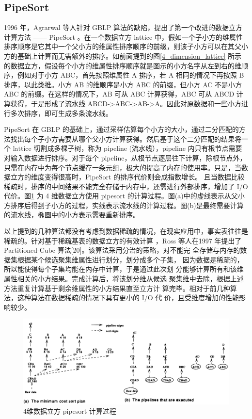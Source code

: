 \subsection{PipeSort}

1996 年，Agrarwal 等人针对 GBLP 算法的缺陷，提出了第一个改进的数据立方计算方法 —— PipeSort\cite{agarwal1996computation} 。在一个数据立方 lattice 中，假如一个子小方的维属性排序顺序是它其中一个父小方的维属性排序顺序的前缀，则该子小方可以在其父小方的基础上计算而无需额外的排序。如前面提到的图\ref{4_dimension_lattice} 所示的数据立方，假设每个小方的维属性排序顺序就是图示的小方名字从左到右的维顺序，例如对于小方 ABC，首先按照维属性 A 排序，若 A 相同的情况下再按照 B 排序，以此类推。小方 AB 的维顺序是小方 ABC 的前缀，但小方 AC 不是小方 ABC 的前缀。在这样的情况下，AB 可从 ABC 计算获得，ABC 可从 ABCD 计算获得，于是形成了流水线 ABCD-\textgreater ABC-\textgreater AB-\textgreater A。因此对原数据和一些小方进行多次排序，即可生成多条流水线。

PipeSort 在 GBLP 的基础上，通过采样估算每个小方的大小，通过二分匹配的方法找出每个子小方需要从哪个父小方计算获得。然后基于这个二分匹配的结果将一个 lattice 切割成多棵子树，称为 pipeline (流水线），pipeline 内只有根节点需要对输入数据进行排序。对于每个 pipeline，从根节点逐层往下计算，除根节点外，只需在内存中为每个节点缓存一条元组，极大的提高了内存的使用率。只是，当数据立方的维度变得很高时，PipeSort 的排序代价则会成指数增长。 且当数据比较稀疏时，排序的中间结果不能完全存储于内存中，还需进行外部排序，增加了 I/O 代价。图\ref{pipesort} 为 4 维数据立方使用 pipesort 的计算过程。图(a)中的虚线表示从父小方排序后得到子小方的过程，实线表示流水线的计算过程。图(b)是最终需要计算的流水线，椭圆中的小方表示需要重新排序。

以上提到的几种算法都没有考虑到数据稀疏的情况，在现实应用中，事实表往往是稀疏的。针对基于稀疏基表的数据立方的有效计算 ，Ross 等人在1997 年提出了 Partitioned-Cube 算法[20]。该算法采用分治的策略，对不能完
全存储与内存的数据集根据某个候选聚集维属性进行划分，划分成多个子集，
因为数据是稀疏的，所以能使得每个子集均能在内存中计算，于是通过此次划
分能够计算所有和该维属性相关的小方结果。完成计算后，将该划分维从候选
聚集维中去除，根据上述方法重复计算基于剩余维属性的小方结果直至立方计
算完毕。相对于前几种算法，这种算法在数据稀疏的情况下具有更小的 I/O 代
价，且受维度增加的性能影响较少。

\begin{figure}[!htb]
\centering\includegraphics[width=5in]{picture/ch_current_research/pipesort} 
\caption{4维数据立方 pipesort 计算过程}\label{pipesort} 
\end{figure} 

